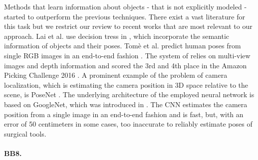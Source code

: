 Methods that learn information about objects - that is not explicitly modeled - started to outperform the previous techniques. There exist a vast literature for this task but we restrict our review to recent works that are most relevant to our approach.
\nnewline
Lai et al. use decision tress in \cite{klai}, which incorporate the semantic information of objects and their poses. Tom{\`{e}} et al. predict human poses from single RGB images in an end-to-end fashion \cite{dtome}. The system of \cite{azeng} relies on multi-view images and depth information and scored the 3rd and 4th place in the Amazon Picking Challenge 2016 \cite{apc}. A prominent example of the problem of camera localization, which is estimating the camera position in 3D space relative to the scene, is PoseNet \cite{posenet}. The underlying architecture of the employed neural network is based on GoogleNet, which was introduced in \cite{googlenet}. The CNN estimates the camera position from a single image in an end-to-end fashion and is fast, but, with an error of 50 centimeters in some cases, too inaccurate to reliably estimate poses of surgical tools.

\paragraph{BB8.}


